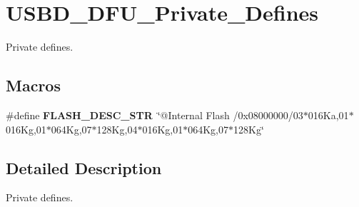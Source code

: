 \hypertarget{group__USBD__DFU__Private__Defines}{}\section{U\+S\+B\+D\+\_\+\+D\+F\+U\+\_\+\+Private\+\_\+\+Defines}
\label{group__USBD__DFU__Private__Defines}


Private defines.  


\subsection*{Macros}
\begin{DoxyCompactItemize}
\item 
\mbox{\label{group__USBD__DFU__Private__Defines_gac85338af5e7940ee58d81965f182a7ce}} 
\#define {\bfseries F\+L\+A\+S\+H\+\_\+\+D\+E\+S\+C\+\_\+\+S\+TR}~\char`\"{}@Internal Flash   /0x08000000/03$\ast$016\+Ka,01$\ast$016\+Kg,01$\ast$064\+Kg,07$\ast$128\+Kg,04$\ast$016\+Kg,01$\ast$064\+Kg,07$\ast$128\+Kg\char`\"{}
\end{DoxyCompactItemize}


\subsection{Detailed Description}
Private defines. 

